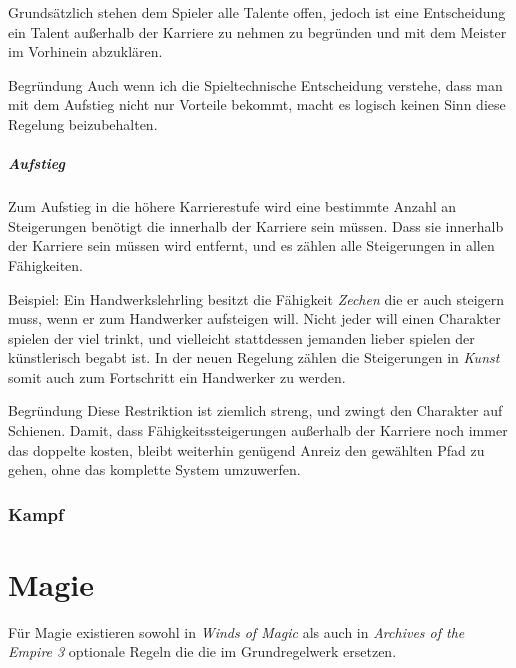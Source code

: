 \documentclass[a4paper]{article}
\begin{document}
\begin{multicols}{2}
Grundsätzlich stehen dem Spieler alle Talente offen, jedoch ist eine Entscheidung ein Talent außerhalb der Karriere zu nehmen zu begründen und mit dem Meister im Vorhinein abzuklären.

\begin{DndComment}{Begründung}
  Auch wenn ich die Spieltechnische Entscheidung verstehe, dass man mit dem Aufstieg nicht nur Vorteile bekommt, macht es logisch keinen Sinn diese Regelung beizubehalten.
\end{DndComment}

\subsubsection{Aufstieg}
Zum Aufstieg in die höhere Karrierestufe wird eine bestimmte Anzahl an Steigerungen benötigt die innerhalb der Karriere sein müssen.
Dass sie innerhalb der Karriere sein müssen wird entfernt, und es zählen alle Steigerungen in allen Fähigkeiten.

Beispiel: Ein Handwerkslehrling besitzt die Fähigkeit \textit{Zechen} die er auch steigern muss, wenn er zum Handwerker aufsteigen will. Nicht jeder will einen Charakter spielen der viel trinkt, und vielleicht stattdessen jemanden lieber spielen der künstlerisch begabt ist. In der neuen Regelung zählen die Steigerungen in \textit{Kunst} somit auch zum Fortschritt ein Handwerker zu werden.

\begin{DndComment}{Begründung}
  Diese Restriktion ist ziemlich streng, und zwingt den Charakter auf Schienen. Damit, dass Fähigkeitssteigerungen außerhalb der Karriere noch immer das doppelte kosten, bleibt weiterhin genügend Anreiz den gewählten Pfad zu gehen, ohne das komplette System umzuwerfen.
\end{DndComment}

\newpage
\section{Kampf}

\part{Magie}

Für Magie existieren sowohl in \textit{Winds of Magic} als auch in \textit{Archives of the Empire 3} optionale Regeln die die im Grundregelwerk ersetzen.

\end{multicols}
\end{document}
